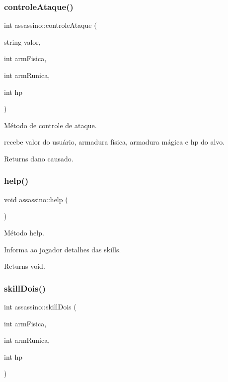 \subsubsection{\texorpdfstring{controle\+Ataque()}{controleAtaque()}}
{\footnotesize\ttfamily int assassino\+::controle\+Ataque (\begin{DoxyParamCaption}\item[{string}]{valor,  }\item[{int}]{arm\+Fisica,  }\item[{int}]{arm\+Runica,  }\item[{int}]{hp }\end{DoxyParamCaption})}



Método de controle de ataque. 

recebe valor do usuário, armadura física, armadura mágica e hp do alvo. \begin{DoxyReturn}{Returns}
dano causado. 
\end{DoxyReturn}
\mbox{\label{classassassino_ae30c9da40ed8c746aa71e784fe20890d}} 
\subsubsection{\texorpdfstring{help()}{help()}}
{\footnotesize\ttfamily void assassino\+::help (\begin{DoxyParamCaption}{ }\end{DoxyParamCaption})}



Método help. 

Informa ao jogador detalhes das skills. \begin{DoxyReturn}{Returns}
void. 
\end{DoxyReturn}
\mbox{\label{classassassino_acd757ef4b59c18d2aa504a6afa15b107}} 
\subsubsection{\texorpdfstring{skill\+Dois()}{skillDois()}}
{\footnotesize\ttfamily int assassino\+::skill\+Dois (\begin{DoxyParamCaption}\item[{int}]{arm\+Fisica,  }\item[{int}]{arm\+Runica,  }\item[{int}]{hp }\end{DoxyParamCaption})}



